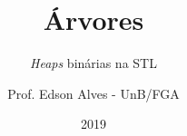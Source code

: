 \title{Árvores}
\subtitle{\textit{Heaps} binárias na STL}
\author{Prof. Edson Alves - UnB/FGA}
\date{2019}

